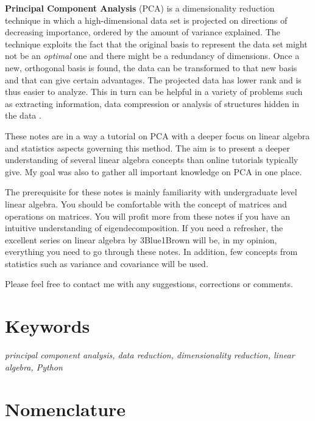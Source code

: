 \documentclass[10pt,twocolumn]{article}
\begin{document}
\textbf{Principal Component Analysis} (PCA) is a dimensionality reduction technique in which a high-dimensional data set is projected on directions of decreasing importance, ordered by the amount of variance explained. The technique exploits the fact that the original basis to represent the data set might not be an \textit{optimal} one and there might be a redundancy of dimensions. Once a new, orthogonal basis is found, the data can be transformed to that new basis and that can give certain advantages. The projected data has lower rank and is thus easier to analyze. This in turn can be helpful in a variety of problems such as extracting information, data compression or analysis of structures hidden in the data \cite{Abdi_Williams}.

These notes are in a way a tutorial on PCA with a deeper focus on linear algebra and statistics aspects governing this method. The aim is to present a deeper understanding of several linear algebra concepts than online tutorials typically give. My goal was also to gather all important knowledge on PCA in one place. 

The prerequisite for these notes is mainly familiarity with undergraduate level linear algebra. You should be comfortable with the concept of matrices and operations on matrices. You will profit more from these notes if you have an intuitive understanding of eigendecomposition. If you need a refresher, the excellent series on linear algebra by 3Blue1Brown \cite{3Blue1Brown} will be, in my opinion, everything you need to go through these notes. In addition, few concepts from statistics such as variance and covariance will be used.

Please feel free to contact me with any suggestions, corrections or comments.

\section*{Keywords}

\textit{principal component analysis, data reduction, dimensionality reduction, linear algebra, Python}

\tableofcontents

\section*{Nomenclature}
\end{document}
